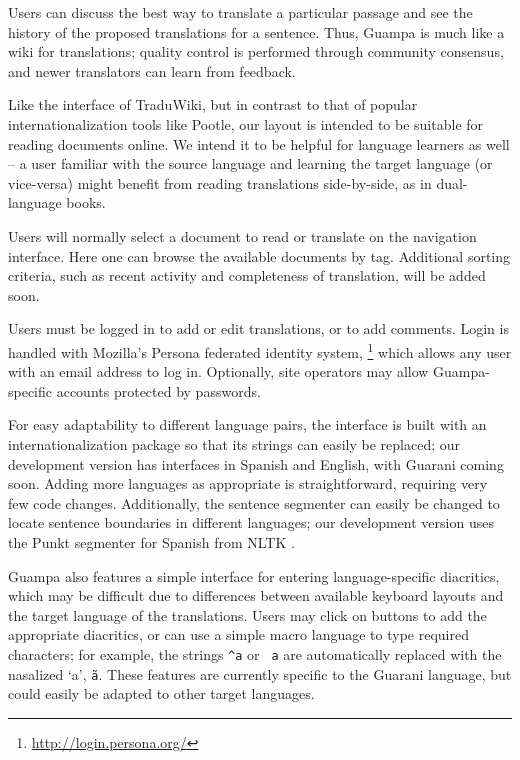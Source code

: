 \documentclass[10pt, a4paper]{article}
\begin{document}
Users can discuss the best way to translate a particular passage and see the
history of the proposed translations for a sentence. Thus, Guampa is much like
a wiki for translations; quality control is performed through community
consensus, and newer translators can learn from feedback.

Like the interface of TraduWiki, but in contrast to that of popular
internationalization tools like Pootle, our layout is intended to be suitable
for reading documents online. We intend it to be helpful for language learners
as well -- a user familiar with the source language and learning the target
language (or vice-versa) might benefit from reading translations side-by-side,
as in dual-language books.

Users will normally select a document to read or translate on the navigation
interface. Here one can browse the available documents by tag. Additional
sorting criteria, such as recent activity and completeness of translation, will
be added soon.

Users must be logged in to add or edit translations, or to add comments.
Login is handled with Mozilla's Persona federated identity system,
\footnote{\url{http://login.persona.org/}}
which allows any user with an email address to log in.
Optionally, site operators may allow Guampa-specific accounts protected by
passwords.

For easy adaptability to different language pairs, the interface is built with
an internationalization package so that its strings can easily be replaced; our
development version has interfaces in Spanish and English, with Guarani coming
soon. Adding more languages as appropriate is straightforward, requiring very
few code changes. Additionally, the sentence segmenter can easily be changed
to locate sentence boundaries in different languages; our development
version uses the Punkt segmenter for Spanish from NLTK \cite{nltkbook}.

Guampa also features a simple interface for entering language-specific
diacritics, which may be difficult due to differences between available
keyboard layouts and the target language of the translations. Users may click
on buttons to add the appropriate diacritics, or can use a simple macro
language to type required characters; for example, the strings
\texttt{\string^a} or 
\texttt{\string~a} are automatically replaced with the nasalized `a',
\texttt{\~a}.
These features are currently specific to the Guarani language, but could easily
be adapted to other target languages.
\end{document}
